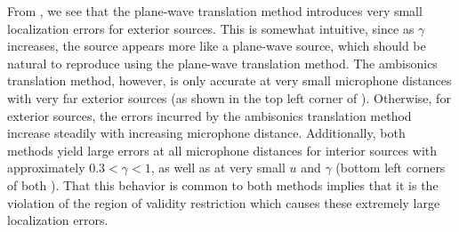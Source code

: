 From , we see that the plane-wave translation method introduces very small localization errors for exterior sources.
This is somewhat intuitive, since as $\gamma$ increases, the source appears more like a plane-wave source, which should be natural to reproduce using the plane-wave translation method.
The ambisonics translation method, however, is only accurate at very small microphone distances with very far exterior sources (as shown in the top left corner of ).
Otherwise, for exterior sources, the errors incurred by the ambisonics translation method increase steadily with increasing microphone distance.
Additionally, both methods yield large errors at all microphone distances for interior sources with approximately $0.3 < \gamma < 1$, as well as at very small $u$ and $\gamma$ (bottom left corners of both ).
That this behavior is common to both methods implies that it is the violation of the region of validity restriction which causes these extremely large localization errors. %

